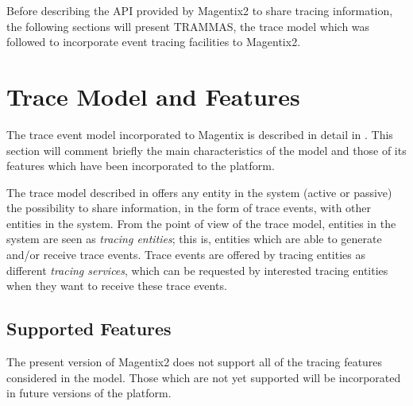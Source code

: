 	Before describing the API provided by Magentix2 to share tracing information, the following sections
	will present TRAMMAS, the trace model which was followed to incorporate event tracing facilities to
	Magentix2.


\section{Trace Model and Features}

	The trace event model incorporated to Magentix is described in detail in \cite{Burdalo10}.
	This section will comment briefly the main characteristics of the model and those of its features which
	have been incorporated to the platform.

	The trace model described in \cite{Burdalo10} offers any entity in the system (active or
	passive) the possibility to share information, in the form of trace events, with other entities in the
	system. From the point of view of the trace model, entities in the system are seen as \textit{tracing
	entities}; this is, entities which are able to generate and/or receive trace events. Trace events are
	offered by tracing entities as different \textit{tracing services}, which can be requested by interested
	tracing entities when they want to receive these trace events.

	\subsection{Supported Features}

		The present version of Magentix2 does not support all of the tracing features considered in the
		model. Those which are not yet supported will be incorporated in future versions of the platform.

